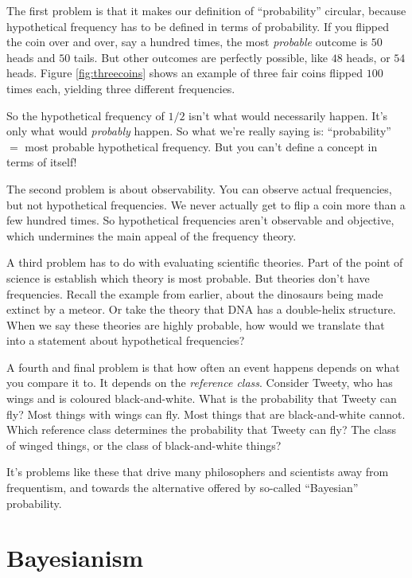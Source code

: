 \documentclass[justified]{tufte-book}
\theoremstyle{definition}
\theoremstyle{definition}
\theoremstyle{definition}
\theoremstyle{remark}
\begin{document}
The first problem is that it makes our definition of ``probability'' circular, because hypothetical frequency has to be defined in terms of probability. If you flipped the coin over and over, say a hundred times, the most \emph{probable} outcome is \(50\) heads and \(50\) tails. But other outcomes are perfectly possible, like \(48\) heads, or \(54\) heads. Figure \ref{fig:threecoins} shows an example of three fair coins flipped \(100\) times each, yielding three different frequencies.

So the hypothetical frequency of \(1/2\) isn't what would necessarily happen. It's only what would \emph{probably} happen. So what we're really saying is: ``probability'' \(=\) most probable hypothetical frequency. But you can't define a concept in terms of itself!

The second problem is about observability. You can observe actual frequencies, but not hypothetical frequencies. We never actually get to flip a coin more than a few hundred times. So hypothetical frequencies aren't observable and objective, which undermines the main appeal of the frequency theory.

A third problem has to do with evaluating scientific theories. Part of the point of science is establish which theory is most probable. But theories don't have frequencies. Recall the example from earlier, about the dinosaurs being made extinct by a meteor. Or take the theory that DNA has a double-helix structure. When we say these theories are highly probable, how would we translate that into a statement about hypothetical frequencies?

A fourth and final problem is that how often an event happens depends on what you compare it to. It depends on the \emph{reference class}. Consider Tweety, who has wings and is coloured black-and-white. What is the probability that Tweety can fly? Most things with wings can fly. Most things that are black-and-white cannot. Which reference class determines the probability that Tweety can fly? The class of winged things, or the class of black-and-white things?

It's problems like these that drive many philosophers and scientists away from frequentism, and towards the alternative offered by so-called ``Bayesian'' probability.

\hypertarget{bayesianism}{%
\section{Bayesianism}\label{bayesianism}}
\end{document}
